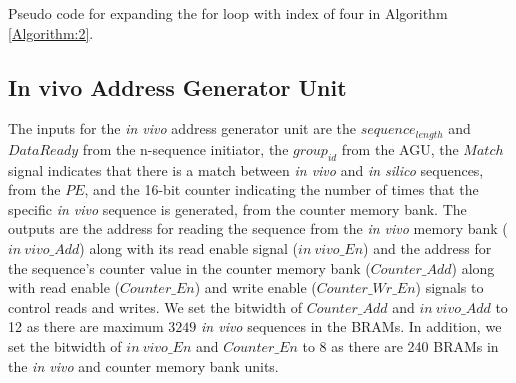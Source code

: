 \begin{algorithm}[t]
 
\nl {}
 \caption{Pseudo code for expanding the for loop with index of four in Algorithm \ref{Algorithm:2}. }
\label{Algorithm:1}
\end{algorithm}


\subsection{In vivo Address Generator Unit }\label{subsec:InVivoAGU}
The inputs for the \emph{in vivo} address generator unit are the $sequence_{length}$ and $Data Ready$ from the n-sequence initiator, the $group_{id}$ from the AGU, the $Match$ signal indicates that there is a match between \emph{in vivo} and \emph{in silico} sequences, from the $PE$, and the 16-bit counter indicating the number of times that the specific \emph{in vivo} sequence is generated, from the counter memory bank. The outputs are the address for reading the sequence from the \emph{in vivo} memory bank ($in~vivo\_Add$) along with its read enable signal ($in~vivo\_En$) and the address for the sequence's counter value in the counter memory bank ($Counter\_Add$) along with read enable ($Counter\_En$) and write enable ($Counter\_Wr\_En$) signals to control reads and writes. We set the bitwidth of $Counter\_Add$ and $in~vivo\_Add$ to 12 as there are maximum $3249$ \emph{in vivo} sequences in the BRAMs. In addition, we set the bitwidth of $in~vivo\_En$ and $Counter\_En$ to 8 as there are 240 BRAMs in the \emph{in vivo} and counter memory bank units.

